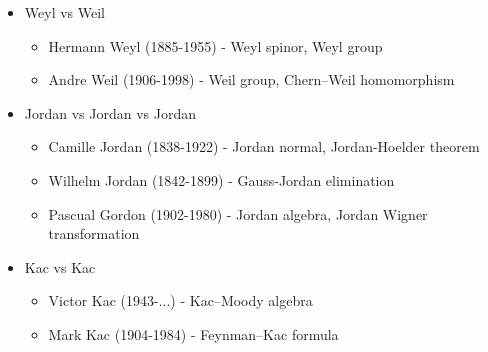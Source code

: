 \documentclass[10pt,a4paper]{article}
\theoremstyle{definition}
\begin{document}
\begin{itemize}
\item Weyl vs Weil
    \begin{itemize}
    \item {\sc Hermann Weyl} (1885-1955) - Weyl spinor, Weyl group
    \item {\sc Andre Weil} (1906-1998) - Weil group, Chern–Weil homomorphism
    \end{itemize}
\item Jordan vs Jordan vs Jordan
    \begin{itemize}
    \item {\sc Camille Jordan} (1838-1922) - Jordan normal, Jordan-Hoelder theorem
    \item {\sc Wilhelm Jordan} (1842-1899) - Gauss-Jordan elimination
    \item {\sc Pascual Gordon} (1902-1980) - Jordan algebra, Jordan Wigner transformation
    \end{itemize}
\item Kac vs Kac
    \begin{itemize}
    \item {\sc Victor Kac} (1943-...) - Kac–Moody algebra
    \item {\sc Mark Kac} (1904-1984) - Feynman–Kac formula
    \end{itemize}
\end{itemize}
\end{document}
